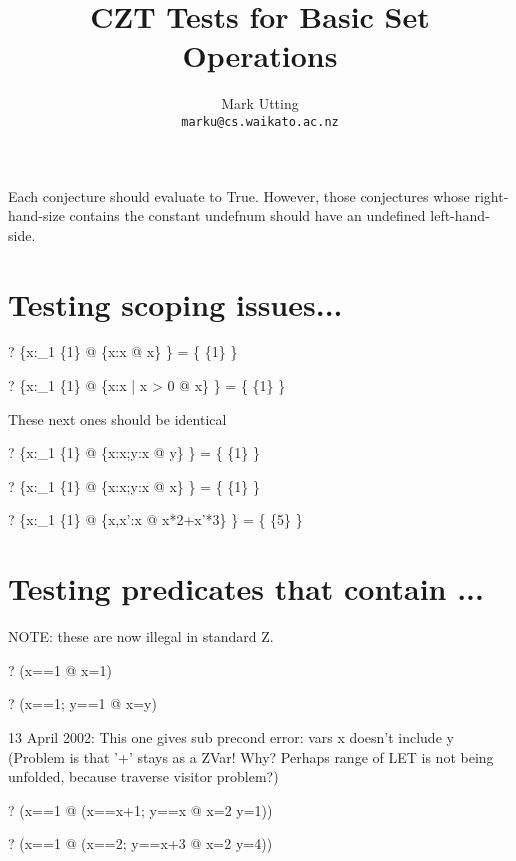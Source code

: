 \documentclass{article}
\title{CZT Tests for Basic Set Operations}
\author{Mark Utting \\ \texttt{marku@cs.waikato.ac.nz}}
\begin{document}
\maketitle

Each conjecture should evaluate to True.
However, those conjectures whose right-hand-size contains
the constant undefnum should have an undefined left-hand-side.


\section{Testing scoping issues...}

\begin{zed} \vdash? \{x:\power_1 \{1\} @ \{x:x @ x\} \} = \{ \{1\} \} \end{zed}
\begin{zed} \vdash? \{x:\power_1 \{1\} @ \{x:x | x > 0 @ x\} \} = \{ \{1\} \} \end{zed}

 These next ones should be identical
\begin{zed} \vdash? \{x:\power_1 \{1\} @ \{x:x;y:x @ y\} \} = \{ \{1\} \} \end{zed}
\begin{zed} \vdash? \{x:\power_1 \{1\} @ \{x:x;y:x @ x\} \} = \{ \{1\} \} \end{zed}

\begin{zed} \vdash? \{x:\power_1 \{1\} @ \{x,x':x @ x*2+x'*3\} \} = \{ \{5\} \} \end{zed}


\section{Testing predicates that contain \LET...}
NOTE: these are now illegal in standard Z.
\begin{zed} \vdash? (\LET x==1 @ x=1) \end{zed}
\begin{zed} \vdash? (\LET x==1; y==1 @ x=y) \end{zed}

 13 April 2002: This one gives sub precond error: vars {x} doesn't include y
 (Problem is that '+' stays as a ZVar!  Why?  Perhaps range of LET
  is not being unfolded, because traverse visitor problem?)
\begin{zed} \vdash? 
   (\exists x==1 @ (\exists x==x+1; y==x @ x=2 \land y=1)) 
\end{zed}
\begin{zed} \vdash? 
   (\exists x==1 @ (\exists x==2; y==x+3 @ x=2 \land y=4))
\end{zed}
\end{document}
